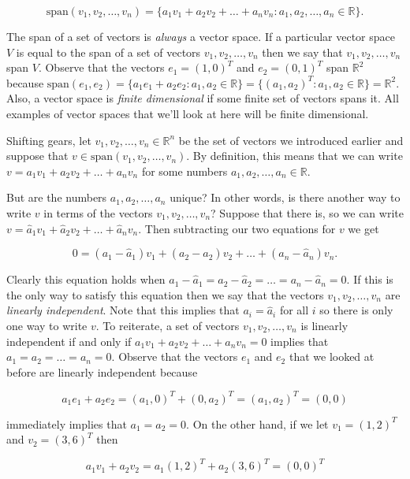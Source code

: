 \documentclass[12pt]{article}
\begin{document}
$$\textrm{span} (v_1, v_2, \ldots, v_n) = \{ a_1 v_1 + a_2 v_2 + \ldots + a_n v_n : a_1, a_2, \ldots, a_n \in \mathbb{R}\}.$$ 

The span of a set of vectors is \textit{always} a vector space. If a particular vector space $V$ is equal to the span of a set of vectors $v_1, v_2, \ldots, v_n$ then we say that $v_1, v_2, \ldots, v_n$ span $V$. Observe that the vectors $e_1 = (1, 0)^T$ and $e_2 = (0, 1)^T$ span $\mathbb{R}^2$ because $\textrm{span} (e_1, e_2) = \{a_1 e_1 + a_2 e_2 : a_1, a_2 \in \mathbb{R}\} = \{(a_1, a_2)^T : a_1, a_2 \in \mathbb{R}\} = \mathbb{R}^2$. Also, a vector space is \textit{finite dimensional} if some finite set of vectors spans it. All examples of vector spaces that we'll look at here will be finite dimensional.

Shifting gears, let $v_1, v_2, \ldots, v_n \in \mathbb{R}^n$ be the set of vectors we introduced earlier and suppose that $v \in \textrm{span}(v_1, v_2, \ldots, v_n)$. By definition, this means that we can write $v = a_1 v_1 + a_2 v_2 + \ldots + a_n v_n$ for some numbers $a_1, a_2, \ldots, a_n \in \mathbb{R}$. 

But are the numbers $a_1, a_2, \ldots, a_n$ unique? In other words, is there another way to write $v$ in terms of the vectors $v_1, v_2, \ldots, v_n$? Suppose that there is, so we can write $v = \hat{a}_1 v_1 + \hat{a}_2 v_2 + \ldots + \hat{a}_n v_n$. Then subtracting our two equations for $v$ we get

$$0 = (a_1 - \hat{a}_1) v_1 + (a_2 - \hat{a}_2) v_2 + \ldots + (a_n - \hat{a}_n) v_n.$$

Clearly this equation holds when $a_1 - \hat{a}_1 = a_2 - \hat{a}_2 = \ldots = a_n - \hat{a}_n = 0$. If this is the only way to satisfy this equation then we say that the vectors $v_1, v_2, \ldots, v_n$ are \textit{linearly independent}. Note that this implies that $a_i = \hat{a}_i$ for all $i$ so there is only one way to write $v$. To reiterate, a set of vectors $v_1, v_2, \ldots, v_n$ is linearly independent if and only if $a_1 v_1 + a_2 v_2 + \ldots + a_n v_n = 0$ implies that $a_1 = a_2 = \ldots = a_n = 0$. Observe that the vectors $e_1$ and $e_2$ that we looked at before are linearly independent because

$$a_1 e_1 + a_2 e_2 = (a_1, 0)^T + (0, a_2)^T = (a_1, a_2)^T = (0, 0)$$

immediately implies that $a_1 = a_2 = 0$. On the other hand, if we let $v_1 = (1, 2)^T$ and $v_2 = (3, 6)^T$ then

$$a_1 v_1 + a_2 v_2 = a_1 (1, 2)^T + a_2 (3, 6)^T = (0, 0)^T$$
\end{document}
